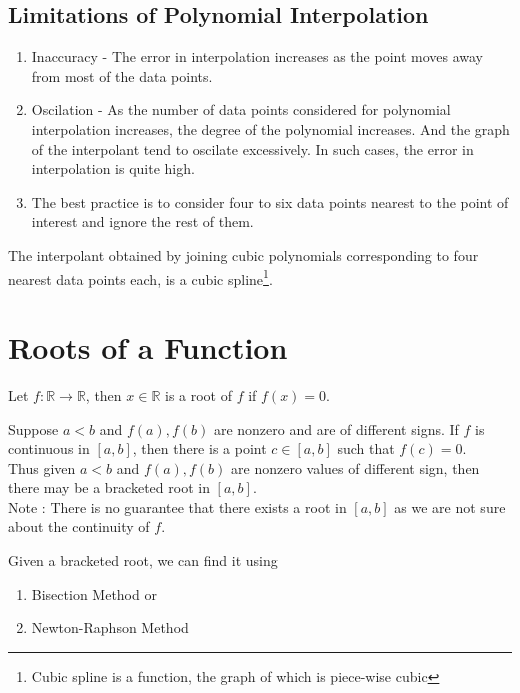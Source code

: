 \subsection{Limitations of Polynomial Interpolation}
\begin{enumerate}
	\item Inaccuracy - The error in interpolation increases as the point moves away from most of the data points.
	\item Oscilation - As the number of data points considered for polynomial interpolation increases, the degree of the polynomial increases. And the graph of the interpolant tend to oscilate excessively. In such cases, the error in interpolation is quite high. 
	\item The best practice is to consider four to six data points nearest to the point of interest and ignore the rest of them.
\end{enumerate}
\begin{remark}
	The interpolant obtained by joining cubic polynomials corresponding to four nearest data points each, is a cubic spline\footnote{Cubic spline is a function, the graph of which is piece-wise cubic}.
\end{remark}

\section{Roots of a Function}
\begin{definition}
	Let $f : \mathbb{R} \to \mathbb{R}$, then $x \in \mathbb{R}$ is a root of $f$ if $f(x) = 0$.
\end{definition}

\begin{remark}
	Suppose $a <  b$ and $f(a), f(b)$ are nonzero and are of different signs. If $f$ is continuous in $[a,b]$, then there is a point $c \in [a,b]$ such that $f(c) = 0$.\\
	
	Thus given $a<b$ and $f(a),f(b)$ are nonzero values of different sign, then there may be a bracketed root in $[a,b]$.\\
	
	Note : There is no guarantee that there exists a root in $[a,b]$ as we are not sure about the continuity of $f$.
\end{remark}

\begin{remark} Given a bracketed root, we can find it using
	\begin{enumerate}
		\item Bisection Method or
		\item Newton-Raphson Method
	\end{enumerate}
\end{remark}

